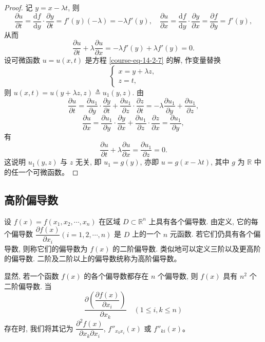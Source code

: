 \documentclass[UTF8,12pt,a4paper,fontset=fandol]{ctexart}
\begin{document}
\begin{proof}\quad 记 $y=x-\lambda t$, 则
\[
  \frac{\partial u}{\partial t}
  =\frac{\mathrm df}{\mathrm dy}\cdot\frac{\partial y}{\partial t}
  =f'(y)(-\lambda)=-\lambda f'(y),
  \quad
  \frac{\partial u}{\partial x}
  =\frac{\mathrm df}{\mathrm dy}\cdot\frac{\partial y}{\partial x}
  =\frac{\partial f}{\partial y}=f'(y),
\]
从而
\[
  \frac{\partial u}{\partial t}+\lambda\frac{\partial u}{\partial x}
  =-\lambda f'(y)+\lambda f'(y)=0.
\]
设可微函数 $u=u(x,t)$ 是方程 \eqref{course-eq-14-2-7}  的解, 作变量替换
\[
  \begin{cases}
    x=y+\lambda z,\\
    z=t,
  \end{cases}
\]
则 $u(x,t)=u(y+\lambda z,z)\triangleq u_1(y,z)$. 由
\[
  \frac{\partial u}{\partial t}
  =\frac{\partial u_1}{\partial y}\cdot\frac{\partial y}{\partial t}
  +\frac{\partial u_1}{\partial z}\cdot\frac{\partial z}{\partial t}
  =-\lambda\frac{\partial u_1}{\partial y}
  +\frac{\partial u_1}{\partial z},
\]
\[
  \frac{\partial u}{\partial x}
  =\frac{\partial u_1}{\partial y}\cdot\frac{\partial y}{\partial x}
  +\frac{\partial u_1}{\partial z}\cdot\frac{\partial z}{\partial x}
  =\frac{\partial u_1}{\partial y},
\]
有
\[
  \frac{\partial u}{\partial t}+\lambda\frac{\partial u}{\partial x}
  =\frac{\partial u_1}{\partial z}=0.
\]
这说明 $u_1(y,z)$ 与 $z$ 无关, 即 $u_1=g(y)$, 亦即 $u=g(x-\lambda t)$, 其中 $g$ 为 $\mathbb R$ 中的任一个可微函数。

\end{proof}
\subsection{高阶偏导数}

设 $f(x)=f(x_1,x_2,\cdots,x_n)$ 在区域 $D\subset\mathbb R^n$ 上具有各个偏导数. 由定义, 它的每个偏导数 $\dfrac{\partial f(x)}{\partial x_i}(i=1,2,\cdots,n)$ 是 $D$ 上的一个 $n$ 元函数. 若它们仍具有各个偏导数, 则称它们的偏导数为 $f(x)$ 的二阶偏导数. 类似地可以定义三阶以及更高阶的偏导数. 二阶及二阶以上的偏导数统称为高阶偏导数。

显然, 若一个函数 $f(x)$ 的各个偏导数都存在 $n$ 个偏导数, 则 $f(x)$ 具有 $n^2$ 个二阶偏导数. 当
\[
  \frac{\partial\left(\dfrac{\partial f(x)}{\partial x_i}\right)}{\partial x_k}
  \quad(1\leqslant i,k\leqslant n)
\]
存在时, 我们将其记为 $\dfrac{\partial^2 f(x)}{\partial x_k\partial x_i}$, $f''_{x_kx_i}(x)$ 或 $f''_{ki}(x)$。
\end{document}
